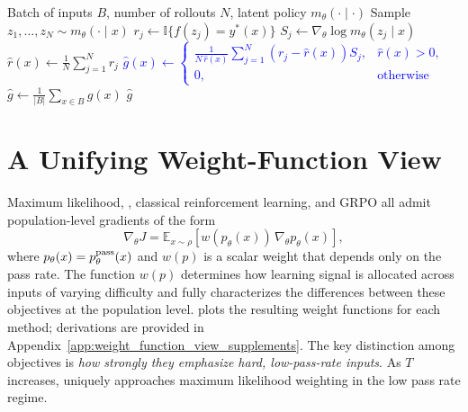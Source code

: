 \documentclass[10pt]{article} %
\begin{document}
\begin{algorithm}[h]
\caption{
\textbf{On-Policy Implementation of \ours{}.}
}
\label{alg:maxRL}
\begin{mdframed}
\small
\begin{algorithmic}[1]
\Require
Batch of inputs $B$,
number of rollouts $N$,
latent policy $m_\theta(\cdot \mid \cdot)$
    \State Sample $z_1,\ldots,z_N \sim m_\theta(\cdot \mid x)$
        \State $r_j \gets \mathbb{I}\{f(z_j)=y^\ast(x)\}$
        \State $S_j \gets \nabla_\theta \log m_\theta(z_j \mid x)$
    \EndFor
    \State $\widehat r(x) \gets \frac{1}{N}\sum_{j=1}^N r_j$
    \State \textcolor{blue}{$
    \widehat g(x) \gets
    \begin{cases}
    \displaystyle
    \frac{1}{N\,\widehat r(x)}\sum_{j=1}^N (r_j - \widehat r(x)) S_j,
    & \widehat r(x) > 0, \\[0.6em]
    0, & \text{otherwise}
    \end{cases}
    $}
\EndFor
\State $\widehat g \gets \frac{1}{|B|}\sum_{x \in B} \widehat g(x)$
\State \Return $\widehat g$
\end{algorithmic}
\end{mdframed}
\end{algorithm} 

\section{A Unifying Weight-Function View}
\label{sec:weight_function_view}
Maximum likelihood, \ours{}, classical reinforcement learning, and GRPO all admit
population-level gradients of the form
\begin{equation}
\nabla_\theta J
=
\mathbb{E}_{x \sim \rho}
\!\left[
w\!\left(p_\theta(x)\right)
\,\nabla_\theta p_\theta(x)
\right],
\label{eq:weight_function_form}
\end{equation}
where $p_\theta(x)=p^{\mathrm{pass}}_{\theta}(x)$ and $w(p)$ is a scalar weight that depends only on
the pass rate. The function $w(p)$ determines how learning signal is allocated
across inputs of varying difficulty and fully characterizes the differences
between these objectives at the population level. 
plots the resulting weight functions for each method; derivations are provided
in Appendix~\ref{app:weight_function_view_supplements}.
The key distinction among objectives is \emph{how strongly they emphasize hard,
low-pass-rate inputs}. As $T$ increases, \ours{} uniquely approaches maximum
likelihood weighting in the low pass rate regime.
\end{document}
